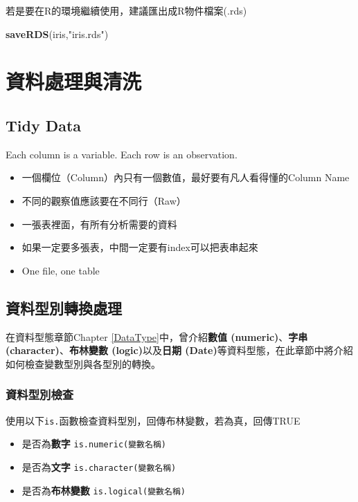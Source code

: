 \documentclass[]{book}
\newenvironment{Shaded}{\begin{snugshade}}{\end{snugshade}}
\newcommand{\KeywordTok}[1]{\textcolor[rgb]{0.13,0.29,0.53}{\textbf{{#1}}}}
\newcommand{\StringTok}[1]{\textcolor[rgb]{0.31,0.60,0.02}{{#1}}}
\newcommand{\NormalTok}[1]{{#1}}
\providecommand{\tightlist}{%
  \setlength{\itemsep}{0pt}\setlength{\parskip}{0pt}}
\theoremstyle{definition}
\theoremstyle{definition}
\theoremstyle{remark}
\begin{document}
若是要在R的環境繼續使用，建議匯出成R物件檔案(.rds)

\begin{Shaded}
\begin{Highlighting}[]
\KeywordTok{saveRDS}\NormalTok{(iris,}\StringTok{"iris.rds"}\NormalTok{)}
\end{Highlighting}
\end{Shaded}

\chapter{資料處理與清洗}\label{manipulation}

\section{Tidy Data}\label{tidy-data}

Each column is a variable. Each row is an observation.

\begin{itemize}
\tightlist
\item
  一個欄位（Column）內只有一個數值，最好要有凡人看得懂的Column Name
\item
  不同的觀察值應該要在不同行（Raw）
\item
  一張表裡面，有所有分析需要的資料
\item
  如果一定要多張表，中間一定要有index可以把表串起來
\item
  One file, one table
\end{itemize}

\section{資料型別轉換處理}

在資料型態章節Chapter \ref{DataType}中，曾介紹\textbf{數值
(numeric)}、\textbf{字串 (character)}、\textbf{布林變數
(logic)}以及\textbf{日期
(Date)}等資料型態，在此章節中將介紹如何檢查變數型別與各型別的轉換。

\subsection{資料型別檢查}

使用以下\texttt{is.}函數檢查資料型別，回傳布林變數，若為真，回傳TRUE

\begin{itemize}
\tightlist
\item
  是否為\textbf{數字} \texttt{is.numeric(變數名稱)}
\item
  是否為\textbf{文字} \texttt{is.character(變數名稱)}
\item
  是否為\textbf{布林變數} \texttt{is.logical(變數名稱)}
\end{itemize}
\end{document}
